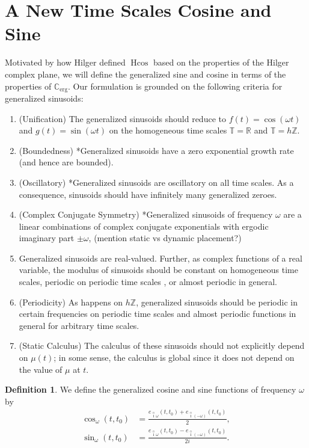 \documentclass[reqno]{amsart}
\theoremstyle{plain}
\theoremstyle{definition}
\newtheorem{definition}{Definition}
\numberwithin{theorem}{section}
\numberwithin{definition}{section}
\numberwithin{prop}{section}
\numberwithin{example}{section}
\newcommand{\R}{\ensuremath{\mathbb{R}}}
\newcommand{\Z}{\ensuremath{\mathbb{Z}}}
\newcommand{\T}{\ensuremath{\mathbb{T}}}
\newcommand{\Cerg}{\ensuremath{\mathbb{C}_{\text{erg}}}}
\DeclareMathOperator{\Hcos}{Hcos} %
\def\icirc{\overset{\odot}{\imath}}
\begin{document}
\section{A New Time Scales Cosine and Sine}

Motivated by how Hilger defined $\Hcos$ based on the properties of the Hilger complex plane, we will define the generalized sine and cosine in terms of the properties of $\Cerg$. Our formulation is grounded on the following criteria for generalized sinusoids:
    \begin{enumerate}
    \item (Unification) The generalized sinusoids should reduce to $f(t)=\cos (\omega t)$ and $g(t)=\sin (\omega t)$ on the homogeneous time scales $\T=\R$ and $\T=h \Z$.
        \item (Boundedness) *Generalized sinusoids have a zero exponential growth rate (and hence are bounded).
        \item (Oscillatory) *Generalized sinusoids are oscillatory on all time scales.  As a consequence, sinusoids should have infinitely many generalized zeroes.
        \item (Complex Conjugate Symmetry) *Generalized sinusoids of frequency $\omega$ are a linear combinations of complex conjugate exponentials with ergodic imaginary part $\pm \omega$, (mention static vs dynamic placement?)
        \item Generalized sinusoids are real-valued.  Further, as complex functions of a real variable, the modulus of sinusoids should be constant on homogeneous time scales, periodic on periodic time scales , or almost periodic in general.
        \item (Periodicity) As happens on $h \Z$, generalized sinusoids should be periodic in certain frequencies on periodic time scales and almost periodic functions in general for arbitrary time scales.
        \item (Static Calculus) The calculus of these sinusoids should not explicitly depend on $\mu(t)$; in some sense, the calculus is global since it does not depend on the value of $\mu$ at $t$.
    \end{enumerate}
    
\begin{definition}
We define the generalized cosine and sine functions of frequency $\omega$ by
\begin{subequations}
\begin{align}
\cos_{\omega}(t,t_0) &= \frac{e_{\icirc \omega}(t,t_0) + e_{\icirc (-\omega)}(t,t_0)}{2},\label{eq:us_cos}\\
\sin_{\omega}(t,t_0) &= \frac{e_{\icirc \omega}(t,t_0) - e_{\icirc (-\omega)}(t,t_0)}{2i}.\label{eq:us_sin}
\end{align*}
\end{subequations}
\end{definition}
\end{document}

